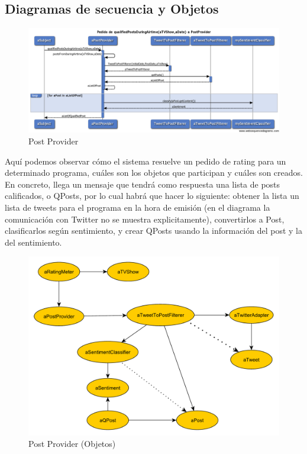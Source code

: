 \subsection{Diagramas de secuencia y Objetos}

\begin{figure}[H]
\centering
\includegraphics[width=\textwidth]{graph/diagramas_secuencia/PostProvider.png}
\caption{Post Provider}
\end{figure}

Aquí podemos observar cómo el sistema resuelve un pedido de rating para un determinado programa, cuáles son los objetos que participan y cuáles son creados. En concreto, llega un mensaje que tendrá como respuesta una lista de posts calificados, o QPosts, por lo cual habrá que hacer lo siguiente: obtener la lista un lista de tweets para el programa en la hora de emisión (en el diagrama la comunicación con Twitter no se muestra explicitamente), convertirlos a Post, clasificarlos según sentimiento, y crear QPosts usando la información del post y la del sentimiento.

\begin{figure}[H]
\centering
\includegraphics[width=\textwidth]{graph/objetos/PostProvider.pdf}
\caption{Post Provider (Objetos)}
\end{figure}



